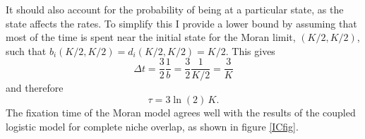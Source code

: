 It should also account for the probability of being at a particular state, as the state affects the rates. 
To simplify this I provide a lower bound by assuming that most of the time is spent near the initial state for the Moran limit, $\left(K/2,K/2\right)$, such that $b_i\left(K/2,K/2\right)=d_i\left(K/2,K/2\right)=K/2$. 
This gives%
\begin{equation}
\Delta t = \frac{3}{2}\frac{1}{b} = \frac{3}{2}\frac{1}{K/2}  = \frac{3}{K}
\end{equation}
and therefore
\begin{equation}
\tau = 3\ln(2)\, K.
 \label{morantime}
\end{equation}%
The fixation time of the Moran model agrees well with the results of the coupled logistic model for complete niche overlap, as shown in figure \ref{ICfig}. 



\iffalse

